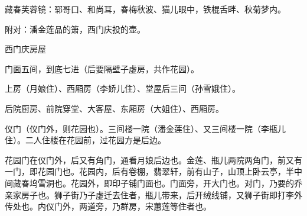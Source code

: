 {藏春芙蓉镜：郓哥口、和尚耳，春梅秋波、猫儿眼中，铁棍舌畔、秋菊梦内。

附对：潘金莲品的箫，西门庆投的壶。

西门庆房屋

门面五间，到底七进（后要隔壁子虚房，共作花园）。

上房（月娘住）、西厢房（李娇儿住）、堂屋后三间（孙雪娥住）。

后院厨房、前院穿堂、大客屋、东厢房（大姐住）、西厢房。

仪门（仪门外，则花园也）。三间楼一院（潘金莲住）、又三间楼一院（李瓶儿住）。二人住楼在花园前，过花园方是后边。

花园门在仪门外，后又有角门，通看月娘后边也。金莲、瓶儿两院两角门，前又有一门，即花园门也。花园内，后有卷棚，翡翠轩，前有山子，山顶上卧云亭，半中间藏春坞雪洞也。花园外，即印子铺门面也。门面旁，开大门也。对门，乃要的乔亲家房子也。狮子街乃子虚迁去住者，瓶儿带来，后开绒线铺，又狮子街即打李外传处也。内仪门外，两道旁，乃群房，宋蕙莲等住者也。

} %

